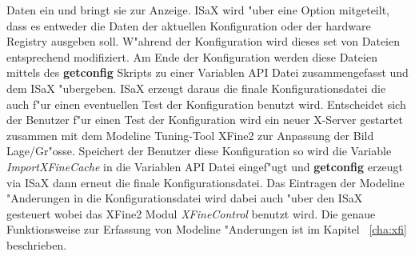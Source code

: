 \begin{itemize}
      Daten ein und bringt sie zur Anzeige. ISaX wird "uber eine
      Option mitgeteilt, dass es entweder die Daten der aktuellen
      Konfiguration oder der hardware Registry ausgeben soll.
      W"ahrend der Konfiguration wird dieses set von Dateien 
      entsprechend modifiziert. Am Ende der Konfiguration werden
      diese Dateien mittels des \textbf{getconfig} Skripts zu einer
      Variablen API Datei zusammengefasst und dem ISaX "ubergeben.
      ISaX erzeugt daraus die finale Konfigurationsdatei die auch
      f"ur einen eventuellen Test der Konfiguration benutzt wird.
      Entscheidet sich der Benutzer f"ur einen Test der Konfiguration
      wird ein neuer X-Server gestartet zusammen mit dem Modeline
      Tuning-Tool XFine2 zur Anpassung der Bild Lage/Gr"osse.
      Speichert der Benutzer diese Konfiguration so wird die
      Variable \textit{ImportXFineCache} in die Variablen API Datei
      eingef"ugt und \textbf{getconfig} erzeugt via ISaX dann erneut 
      die finale Konfigurationsdatei. Das Eintragen der Modeline
      "Anderungen in die Konfigurationsdatei wird dabei auch "uber
      den ISaX gesteuert wobei das XFine2 Modul \textit{XFineControl}
      benutzt wird. Die genaue Funktionsweise zur Erfassung von Modeline
      "Anderungen ist im Kapitel ~\ref{cha:xfi} beschrieben.
\end{itemize}

